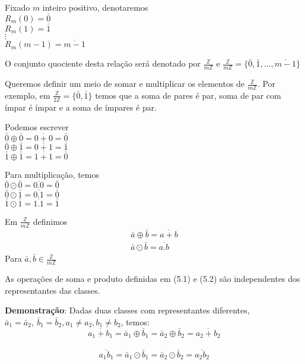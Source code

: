 \begin{nota} Fixado $m$ inteiro positivo, denotaremos\\
$R_{m}(0)=\bar{0}$\\
$R_{m}(1)=\bar{1}$\\
$\vdots$\\
$R_{m}(m-1)=\overline{m-1}$

O conjunto quociente desta relação será denotado por $\displaystyle\frac{\mathbb{Z}}{m\mathbb{Z}}$ e $\displaystyle\frac{\mathbb{Z}}{m\mathbb{Z}}=\{\bar{0},\bar{1},...,\overline{m-1}\}$
\end{nota}

Queremos definir um meio de somar e multiplicar os elementos de $\displaystyle\frac{\mathbb{Z}}{m\mathbb{Z}}$. Por exemplo, em $\displaystyle\frac{\mathbb{Z}}{2\mathbb{Z}}=\{\bar{0},\bar{1}\}$ temos que a soma de pares é par, soma de par com ímpar é ímpar e a soma de ímpares é par.

Podemos escrever
\vspace{0,05cm}\\
$\bar{0}\oplus\bar{0}=\overline{0+0}=\bar{0}$\\
$\bar{0}\oplus\bar{1}=\overline{0+1}=\bar{1}$\\
$\bar{1}\oplus\bar{1}=\overline{1+1}=\bar{0}$

Para multiplicação, temos
\vspace{0,05cm}\\
$\bar{0}\odot\bar{0}=\overline{0.0}=\bar{0}$\\
$\bar{0}\odot\bar{1}=\overline{0.1}=\bar{0}$\\
$\bar{1}\odot\bar{1}=\overline{1.1}=\bar{1}$

Em $\displaystyle\frac{\mathbb{Z}}{m\mathbb{Z}}$ definimos
\begin{eqnarray}
\bar{a}\oplus\bar{b}=\overline{a+b}\\
\bar{a}\odot\bar{b}=\overline{a.b}
\end{eqnarray}
Para $\bar{a},\bar{b}\in\displaystyle\frac{\mathbb{Z}}{m\mathbb{Z}}$

\begin{proposicao} As operações de soma e produto definidas em (5.1) e (5.2) são independentes dos representantes das classes.\end{proposicao}

\textbf{Demonstração}: Dadas duas classes com representantes diferentes, $\bar{a}_{1}=\bar{a}_{2},\  \bar{b}_{1}=\bar{b}_{2}, a_{1}\ne a_{2}, b_{1}\ne b_{2}$, temos:\\
\[\overline{a_{1}+b_{1}}=\bar{a}_{1}\oplus\bar{b}_{1}=\bar{a}_{2}\oplus\bar{b}_{2}=\overline{a_{2}+b_{2}}\]\\
\[\overline{a_{1}b_{1}}=\bar{a}_{1}\odot\bar{b}_{1}=\bar{a}_{2}\odot\bar{b}_{2}=\overline{a_{2}b_{2}}\]\\

